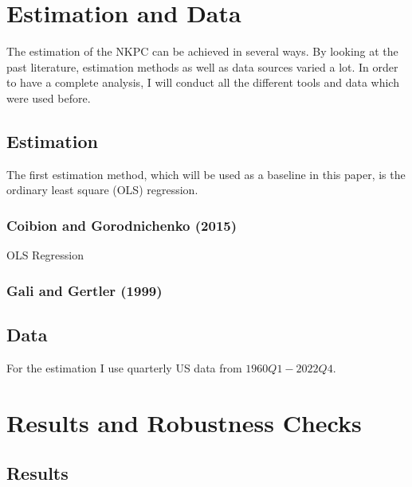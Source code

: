 \documentclass[11pt, a4paper, leqno]{article}
\begin{document}
\section{Estimation and Data}
The estimation of the NKPC can be achieved in several ways. By looking at the past literature, estimation methods as well as data sources varied a lot. In order to have a complete analysis, I will conduct all the different tools and data which were used before.
\subsection{Estimation}
The first estimation method, which will be used as a baseline in this paper, is the ordinary least square (OLS) regression.
\subsubsection{Coibion and Gorodnichenko (2015)}
OLS Regression

\subsubsection{Gali and Gertler (1999)}

\subsection{Data}
For the estimation I use quarterly US data from $1960Q1-2022Q4$.

\section{Results and Robustness Checks}
\subsection{Results}
\end{document}
